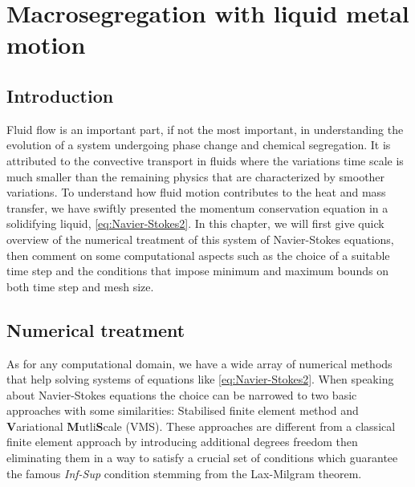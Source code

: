 \chapter{Macrosegregation with liquid metal motion}
\begin{nolinkcolors} 
\minitoc
\end{nolinkcolors}
\newpage
%
%
\section{Introduction}
Fluid flow is an important part, if not the most important, in understanding the evolution of a system
undergoing phase change and chemical segregation. It is attributed to the convective transport in fluids
where the variations time scale is much smaller than the remaining physics that are characterized by
smoother variations. To understand how fluid motion contributes to the heat and mass transfer, we have 
swiftly presented the momentum conservation equation in a solidifying liquid, \cref{eq:Navier-Stokes2}.
In this chapter, we will first give quick overview of the numerical treatment of this system of 
Navier-Stokes equations, then comment on some computational aspects such as the choice of a suitable time step and
the conditions that impose minimum and maximum bounds on both time step and mesh size.
%
%
\section{Numerical treatment}
As for any computational domain, we have a wide array of numerical methods that help solving systems of equations 
like \cref{eq:Navier-Stokes2}. When speaking about Navier-Stokes equations the choice can be narrowed to two basic
approaches with some similarities: Stabilised finite element method and \textbf{V}ariational \textbf{M}utli\textbf{S}cale (VMS).
These approaches are different from a classical finite element approach by introducing additional degrees freedom then 
eliminating them in a way to satisfy a crucial set of conditions which guarantee the famous \emph{Inf-Sup} condition stemming
from the Lax-Milgram theorem.
%
